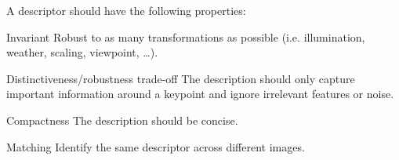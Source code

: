 \begin{description}
\begin{descriptionlist}
                A descriptor should have the following properties:
                \begin{descriptionlist}
                    \item[Invariant] Robust to as many transformations as possible (i.e. illumination, weather, scaling, viewpoint, \dots).
                    \item[Distinctiveness/robustness trade-off] The description should only capture important information around a keypoint and 
                        ignore irrelevant features or noise.
                    \item[Compactness] The description should be concise.
                \end{descriptionlist}


            \item[Matching] 
                Identify the same descriptor across different images.
        \end{descriptionlist}
\end{description}

